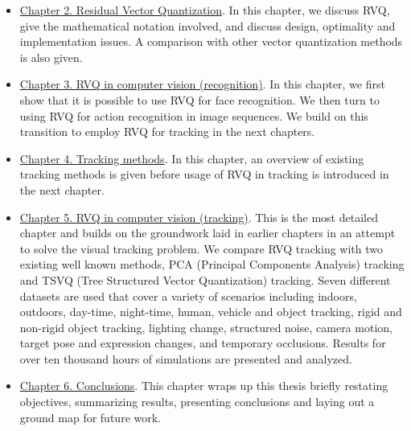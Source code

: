 \begin{itemize}
\item \underline{Chapter 2.  Residual Vector Quantization}.  In this chapter, we discuss RVQ, give the mathematical notation involved, and discuss design, optimality and implementation issues.  A comparison with other vector quantization methods is also given.
\item \underline{Chapter 3.  RVQ in computer vision (recognition)}.  In this chapter, we first show that it is possible to use RVQ for face recognition.  We then turn to using RVQ for action recognition in image sequences.  We build on this transition to employ RVQ for tracking in the next chapters.
\item \underline{Chapter 4.  Tracking methods}.  In this chapter, an overview of existing tracking methods is given before usage of RVQ in tracking is introduced in the next chapter.
\item \underline{Chapter 5.  RVQ in computer vision (tracking)}.  This is the most detailed chapter and builds on the groundwork laid in earlier chapters in an attempt to solve the visual tracking problem.  We compare RVQ tracking with two existing well known methods, PCA (Principal Components Analysis) tracking and TSVQ (Tree Structured Vector Quantization) tracking.  Seven different datasets are used that cover a variety of scenarios including indoors, outdoors, day-time, night-time, human, vehicle and object tracking, rigid and non-rigid object tracking, lighting change, structured noise, camera motion, target pose and expression changes, and temporary occlusions.  Results for over ten thousand hours of simulations are presented and analyzed.
\item \underline{Chapter 6.  Conclusions}.  This chapter wraps up this thesis briefly restating objectives, summarizing results, presenting conclusions and laying out a ground map for future work.
\end{itemize}










